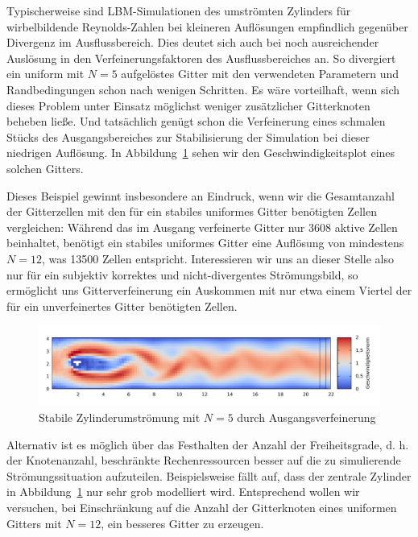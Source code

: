 Typischerweise sind LBM-Simulationen des umströmten Zylinders für wirbelbildende Reynolds-Zahlen bei kleineren Auflösungen empfindlich gegenüber Divergenz im Ausflussbereich. Dies deutet sich auch bei noch ausreichender Auslösung in den Verfeinerungsfaktoren des Ausflussbereiches an. So divergiert ein uniform mit \(N=5\) aufgelöstes Gitter mit den verwendeten Parametern und Randbedingungen schon nach wenigen Schritten.
Es wäre vorteilhaft, wenn sich dieses Problem unter Einsatz möglichst weniger zusätzlicher Gitterknoten beheben ließe. Und tatsächlich genügt schon die Verfeinerung eines schmalen Stücks des Ausgangsbereiches zur Stabilisierung der Simulation bei dieser niedrigen Auflösung. In Abbildung~\ref{fig:CylinderOptimizedGridN5} sehen wir den Geschwindigkeitsplot eines solchen Gitters.

\bigskip

Dieses Beispiel gewinnt insbesondere an Eindruck, wenn wir die Gesamtanzahl der Gitterzellen mit den für ein stabiles uniformes Gitter benötigten Zellen vergleichen: Während das im Ausgang verfeinerte Gitter nur 3608 aktive Zellen beinhaltet, benötigt ein stabiles uniformes Gitter eine Auflösung von mindestens \(N=12\), was 13500 Zellen entspricht. Interessieren wir uns an dieser Stelle also nur für ein subjektiv korrektes und nicht-divergentes Strömungsbild, so ermöglicht uns Gitterverfeinerung ein Auskommen mit nur etwa einem Viertel der für ein unverfeinertes Gitter benötigten Zellen.

\begin{figure}[h]
\begin{adjustbox}{center}
\includegraphics[width=1.2\textwidth]{img/static/cylinder2d_low_resolution_outflow_refine_n5_re100_16s.pdf}
\end{adjustbox}
\caption{Stabile Zylinderumströmung mit \(N=5\) durch Ausgangsverfeinerung}
\label{fig:CylinderOptimizedGridN5}
\end{figure}

Alternativ ist es möglich über das Festhalten der Anzahl der Freiheitsgrade, d. h. der Knotenanzahl, beschränkte Rechenressourcen besser auf die zu simulierende Strömungssituation aufzuteilen. Beispielsweise fällt auf, dass der zentrale Zylinder in Abbildung~\ref{fig:CylinderOptimizedGridN5} nur sehr grob modelliert wird. Entsprechend wollen wir versuchen, bei Einschränkung auf die Anzahl der Gitterknoten eines uniformen Gitters mit \(N=12\), ein besseres Gitter zu erzeugen.

